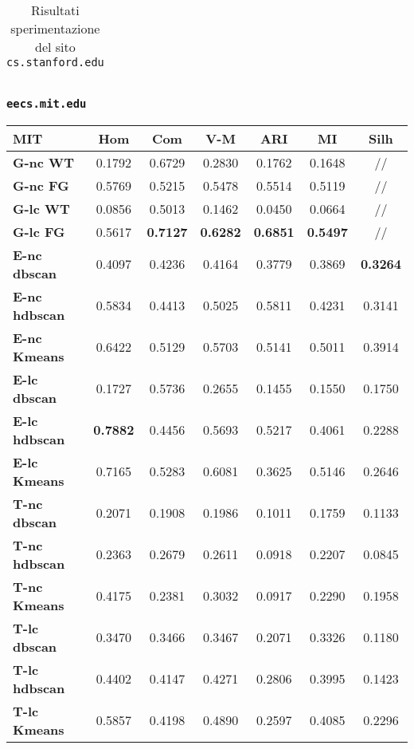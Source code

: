 \begin{table}[H]
\begin{tabular}{| l | c | c | c | c | c | c |}
	\end{tabular}
	\caption{Risultati sperimentazione del sito \texttt{cs.stanford.edu}}
	\label{metricheStanf}
\end{table}

\subsubsection{\texttt{eecs.mit.edu}}

\begin{table}[H]
	\begin{tabular}{| l | c | c | c | c | c | c |}
	\hline
	\textbf{MIT}  & \textbf{Hom} & \textbf{Com} & \textbf{V-M}  & \textbf{ARI}  & \textbf{MI}  & \textbf{Silh} \\ [2ex] \hline
	\textbf{G-nc WT} & 0.1792 & 0.6729 & 0.2830 & 0.1762 & 0.1648 & // \\ [2ex]
	 \hline
	\textbf{G-nc FG} & 0.5769 & 0.5215 & 0.5478 & 0.5514 & 0.5119 & // \\ [2ex]
	 \hline	
	\textbf{G-lc WT} & 0.0856 & 0.5013 & 0.1462 & 0.0450 & 0.0664 & // \\ [2ex]
	 \hline	
	\textbf{G-lc FG} & 0.5617 & \textbf{0.7127} & \textbf{0.6282} & \textbf{0.6851} & \textbf{0.5497} & // \\ [2ex]
	\hline

	\textbf{E-nc dbscan} & 0.4097 & 0.4236 & 0.4164 & 0.3779 & 0.3869 & \textbf{0.3264}\\ [2ex]
	 \hline 
	\textbf{E-nc hdbscan} & 0.5834 & 0.4413 & 0.5025 & 0.5811 & 0.4231 & 0.3141\\ [2ex]
	 \hline
	\textbf{E-nc Kmeans} & 0.6422 & 0.5129 & 0.5703 & 0.5141 & 0.5011 & 0.3914\\ [2ex]
	 \hline	
	\textbf{E-lc dbscan} & 0.1727 & 0.5736 & 0.2655 & 0.1455 & 0.1550 & 0.1750\\ [2ex]
	\hline
	\textbf{E-lc hdbscan} & \textbf{0.7882} & 0.4456 & 0.5693 & 0.5217 & 0.4061 & 0.2288\\ [2ex]
	\hline
	\textbf{E-lc Kmeans} & 0.7165 & 0.5283 & 0.6081 & 0.3625 & 0.5146 & 0.2646\\ [2ex]
	\hline
	
	\textbf{T-nc dbscan} & 0.2071 & 0.1908 & 0.1986 & 0.1011 & 0.1759 & 0.1133\\ [2ex]
	 \hline 
	\textbf{T-nc hdbscan} & 0.2363 & 0.2679 & 0.2611 & 0.0918 & 0.2207 & 0.0845\\ [2ex]
	 \hline
	\textbf{T-nc Kmeans} & 0.4175 & 0.2381 & 0.3032 & 0.0917 & 0.2290 & 0.1958\\ [2ex]
	 \hline	
	\textbf{T-lc dbscan} & 0.3470 & 0.3466 & 0.3467 & 0.2071 & 0.3326 & 0.1180\\ [2ex]
	\hline
	\textbf{T-lc hdbscan} & 0.4402 & 0.4147 & 0.4271 & 0.2806 & 0.3995 & 0.1423\\ [2ex]
	\hline
	\textbf{T-lc Kmeans} & 0.5857 & 0.4198 & 0.4890 & 0.2597 & 0.4085 & 0.2296\\ [2ex]
	\hline
	

\end{tabular}
\end{table}
